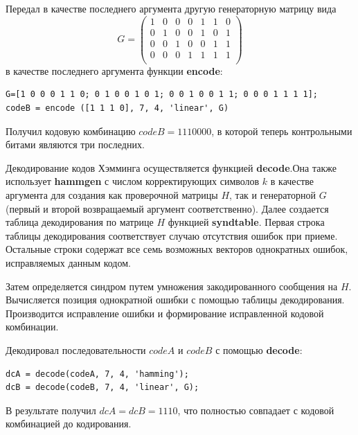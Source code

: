 \documentclass[12pt,a4paper]{article}
\begin{document}
  Передал в качестве последнего аргумента другую генераторную матрицу вида
\[
  G=
  \begin{pmatrix} 
		1 & 0 & 0 & 0 & 1 & 1 & 0 \\ 
		0 & 1 & 0 & 0 & 1 & 0 & 1 \\ 
		0 & 0 & 1 & 0 & 0 & 1 & 1 \\ 
		0 & 0 & 0 & 1 & 1 & 1 & 1 \\ 
  \end{pmatrix}
\]
  в качестве последнего аргумента функции \textbf{encode}:
  \begin{lstlisting}
G=[1 0 0 0 1 1 0; 0 1 0 0 1 0 1; 0 0 1 0 0 1 1; 0 0 0 1 1 1 1];
codeB = encode ([1 1 1 0], 7, 4, 'linear', G)
  \end{lstlisting}
  Получил кодовую комбинацию $codeB=1110000$, в которой теперь контрольными битами являются три последних.
  
  Декодирование кодов Хэмминга осуществляется функцией \textbf{decode}.\linebreak Она также использует \textbf{hammgen} с числом корректирующих символов $k$ в качестве аргумента для создания как проверочной матрицы $H$, так и генераторной $G$ (первый и второй возвращаемый аргумент соответственно). Далее создается таблица декодирования по матрице $H$ функцией \textbf{syndtable}. Первая строка таблицы декодирования соответствует случаю отсутствия ошибок при приеме. Остальные строки содержат все семь возможных векторов однократных ошибок, исправляемых данным кодом.
  
  Затем определяется синдром путем умножения закодированного сообщения на $H$. Вычисляется позиция однократной ошибки с помощью таблицы декодирования. Производится исправление ошибки и формирование исправленной кодовой комбинации.
  
  Декодировал последовательности $codeA$ и $codeB$ с помощью \textbf{decode}:
  \begin{lstlisting}
dcA = decode(codeA, 7, 4, 'hamming');
dcB = decode(codeB, 7, 4, 'linear', G);
  \end{lstlisting}
  В результате получил $dcA=dcB=1110$, что полностью совпадает с кодовой комбинацией до кодирования.
  
\end{document}
